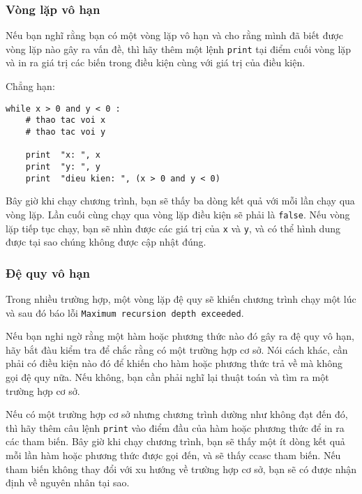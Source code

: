 \documentclass[11pt]{book}
\begin{document}
\subsubsection{Vòng lặp vô hạn}

Nếu bạn nghĩ rằng bạn có một vòng lặp vô hạn và cho rằng mình đã biết
được vòng lặp nào gây ra vấn đề, thì hãy thêm một lệnh {\tt print} tại
điểm cuối vòng lặp và in ra giá trị các biến trong điều kiện cùng với
giá trị của điều kiện.

Chẳng hạn:

\beforeverb
\begin{verbatim}
while x > 0 and y < 0 :
    # thao tac voi x
    # thao tac voi y

    print  "x: ", x
    print  "y: ", y
    print  "dieu kien: ", (x > 0 and y < 0)
\end{verbatim}
\afterverb
%
Bây giờ khi chạy chương trình, bạn sẽ thấy ba dòng kết quả
với mỗi lần chạy qua vòng lặp. Lần cuối cùng chạy qua vòng lặp
điều kiện sẽ phải là {\tt false}.  Nếu vòng lặp tiếp tục chạy,
bạn sẽ nhìn được các giá trị của {\tt x} và {\tt y},
và có thể hình dung được tại sao chúng không được cập nhật đúng.


\subsubsection{Đệ quy vô hạn}

Trong nhiều trường hợp, một vòng lặp đệ quy sẽ khiến chương trình 
chạy một lúc và sau đó báo lỗi {\tt Maximum recursion depth exceeded}.

Nếu bạn nghi ngờ rằng một hàm hoặc phương thức nào đó gây ra đệ quy
vô hạn, hãy bắt đàu kiểm tra để chắc rằng có một trường hợp cơ sở.
Nói cách khác, cần phải có điều kiện nào đó để khiến cho hàm hoặc
phương thức trả về mà không gọi đệ quy nữa. Nếu không, bạn cần phải
nghĩ lại thuật toán và tìm ra một trường hợp cơ sở.

Nếu có một trường hợp cơ sở nhưng chương trình dường như không đạt
đến đó, thì hãy thêm câu lệnh {\tt print} vào điểm đầu của hàm hoặc phương thức
để in ra các tham biến. Bây giờ khi chạy chương trình, bạn sẽ thấy
một ít dòng kết quả mỗi lần hàm hoặc phương thức được gọi đến, và 
sẽ thấy ccasc tham biến. Nếu tham biến không thay đổi với xu hướng về
trường hợp cơ sở, bạn sẽ có được nhận định về nguyên nhân tại sao.
\end{document}
